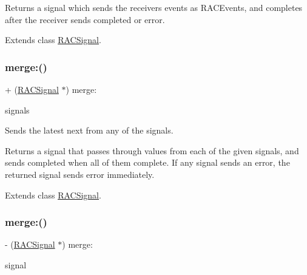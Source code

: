 Returns a signal which sends the receiver\textquotesingle{}s events as R\+A\+C\+Events, and completes after the receiver sends {\ttfamily completed} or {\ttfamily error}. 

Extends class \mbox{\hyperlink{interface_r_a_c_signal_a2b970ec1845b139478ba31f00fe34b71}{R\+A\+C\+Signal}}.

\mbox{\label{category_r_a_c_signal_07_operations_08_a37d7e9c259ad5253a1f3ff644a86e52b}} 
\subsubsection{\texorpdfstring{merge\+:()}{merge:()}\hspace{0.1cm}{\footnotesize\ttfamily [1/6]}}
{\footnotesize\ttfamily + (\mbox{\hyperlink{interface_r_a_c_signal}{R\+A\+C\+Signal}} $\ast$) merge\+: \begin{DoxyParamCaption}\item[{(id$<$N\+S\+Fast\+Enumeration$>$)}]{signals }\end{DoxyParamCaption}}

Sends the latest {\ttfamily next} from any of the signals.

Returns a signal that passes through values from each of the given signals, and sends {\ttfamily completed} when all of them complete. If any signal sends an error, the returned signal sends {\ttfamily error} immediately. 

Extends class \mbox{\hyperlink{interface_r_a_c_signal_a37d7e9c259ad5253a1f3ff644a86e52b}{R\+A\+C\+Signal}}.

\mbox{\label{category_r_a_c_signal_07_operations_08_aeda66daaf146a2d218ba7819297628a9}} 
\subsubsection{\texorpdfstring{merge\+:()}{merge:()}\hspace{0.1cm}{\footnotesize\ttfamily [2/6]}}
{\footnotesize\ttfamily -\/ (\mbox{\hyperlink{interface_r_a_c_signal}{R\+A\+C\+Signal}} $\ast$) merge\+: \begin{DoxyParamCaption}\item[{(\mbox{\hyperlink{interface_r_a_c_signal}{R\+A\+C\+Signal}} $\ast$)}]{signal }\end{DoxyParamCaption}}


